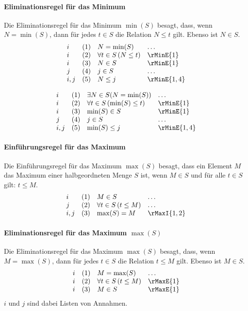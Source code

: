 \documentclass{book}
\theoremstyle{plain}
\theoremstyle{remark}
\theoremstyle{definition}
\begin{document}
\paragraph{Eliminationsregel für das Minimum}
Die Eliminationsregel für das Minimum \(\min(S)\) besagt, dass, wenn \(N = \min(S)\), dann für jedes \(t \in S\) die Relation \(N \leq t\) gilt. Ebenso ist \(N \in S\).
\[
\begin{array}{llll}
    i & (1) & N = \min(S) & \dots \\
    i & (2) & \forall t \in S \, (N \leq t) & \rMinE{1} \\
    i & (3) & N \in S & \rMinE{1}\\
    j & (4) & j \in S & \hdots\\
    i,j & (5) & N\leq j & \rMinE{1,4}\\
\end{array}
\]

\[
\begin{array}{llll}
    i & (1) & \exists N\in S(N = \min(S)) & \dots \\
    i & (2) & \forall t \in S \, (\min(S) \leq t) & \rMinE{1} \\
    i & (3) & \min(S) \in S & \rMinE{1}\\
    j & (4) & j \in S & \hdots\\
    i,j & (5) & \min(S)\leq j & \rMinE{1,4}\\
\end{array}
\]

\paragraph{Einführungsregel für das Maximum}
Die Einführungsregel für das Maximum \(\max(S)\) besagt, dass ein Element \(M\) das Maximum einer halbgeordneten Menge \(S\) ist, wenn \(M \in S\) und für alle \(t \in S\) gilt: \(t \leq M\).
\[
\begin{array}{llll}
    i   & (1) & M \in S & \dots \\
    j   & (2) & \forall t \in S \, (t \leq M) & \dots \\
    i,j & (3) & \max(S) = M & \rMaxI{1,2}
\end{array}
\]

\paragraph{Eliminationsregel für das Maximum \(\max(S)\)}
Die Eliminationsregel für das Maximum \(\max(S)\) besagt, dass, wenn \(M = \max(S)\), dann für jedes \(t \in S\) die Relation \(t \leq M\) gilt. Ebenso ist \(M \in S\).
\[
\begin{array}{llll}
    i & (1) & M = \max(S) & \dots \\
    i & (2) & \forall t \in S \, (t \leq M) & \rMaxE{1} \\
    i & (3) & M \in S & \rMaxE{1}
\end{array}
\]
\(i\) und \(j\) sind dabei Listen von Annahmen.
\end{document}
